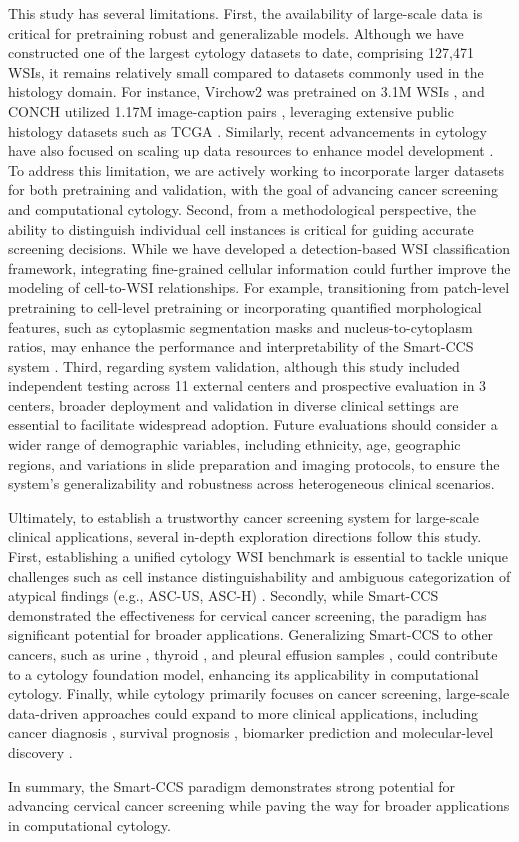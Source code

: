 This study has several limitations. 
First, the availability of large-scale data is critical for pretraining robust and generalizable models. Although we have constructed one of the largest cytology datasets to date, comprising 127,471 WSIs, it remains relatively small compared to datasets commonly used in the histology domain. For instance, Virchow2 was pretrained on 3.1M WSIs \cite{vorontsov2024foundation}, and CONCH utilized 1.17M image-caption pairs \cite{lu2024visual}, leveraging extensive public histology datasets such as TCGA \cite{weinstein2013cancer}. Similarly, recent advancements in cytology have also focused on scaling up data resources to enhance model development \cite{yu2023ai}. To address this limitation, we are actively working to incorporate larger datasets for both pretraining and validation, with the goal of advancing cancer screening and computational cytology.
Second, from a methodological perspective, the ability to distinguish individual cell instances is critical for guiding accurate screening decisions. While we have developed a detection-based WSI classification framework, integrating fine-grained cellular information could further improve the modeling of cell-to-WSI relationships. For example, transitioning from patch-level pretraining to cell-level pretraining or incorporating quantified morphological features, such as cytoplasmic segmentation masks and nucleus-to-cytoplasm ratios, may enhance the performance and interpretability of the Smart-CCS system \cite{zhu2021hybrid}.
Third, regarding system validation, although this study included independent testing across 11 external centers and prospective evaluation in 3 centers, broader deployment and validation in diverse clinical settings are essential to facilitate widespread adoption. Future evaluations should consider a wider range of demographic variables, including ethnicity, age, geographic regions, and variations in slide preparation and imaging protocols, to ensure the system's generalizability and robustness across heterogeneous clinical scenarios.

Ultimately, to establish a trustworthy cancer screening system for large-scale clinical applications, several in-depth exploration directions follow this study. First, establishing a unified cytology WSI benchmark is essential to tackle unique challenges such as cell instance distinguishability and ambiguous categorization of atypical findings (e.g., ASC-US, ASC-H) \cite{jiang2024holistic}.  
Secondly, while Smart-CCS demonstrated the effectiveness for cervical cancer screening, the paradigm has significant potential for broader applications. Generalizing Smart-CCS to other cancers, such as urine \cite{wu2024development}, thyroid \cite{wang2024deep}, and pleural effusion samples \cite{tian2024prediction}, could contribute to a cytology foundation model, enhancing its applicability in computational cytology. Finally, while cytology primarily focuses on cancer screening, large-scale data-driven approaches could expand to more clinical applications, including cancer diagnosis \cite{wu2024development}, survival prognosis \cite{sigel2017cytology,valletti2021gastric}, biomarker prediction \cite{tian2024prediction,rassy2024predicting,li2024new} and molecular-level discovery \cite{caputo2024current, ohori2024molecular}.


In summary, the Smart-CCS paradigm demonstrates strong potential for advancing cervical cancer screening while paving the way for broader applications in computational cytology.

